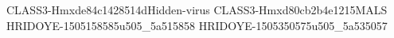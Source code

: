 CLASS3-Hmxde84c1428514dHidden-virus
CLASS3-Hmxd80cb2b4e1215MALS
HRIDOYE-1505158585u505_5a515858
HRIDOYE-1505350575u505_5a535057
